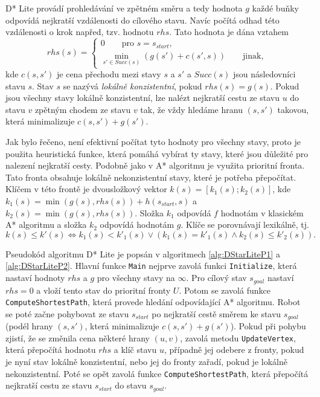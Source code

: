 D* Lite provádí prohledávání ve zpětném směru a tedy hodnota $g$ každé buňky odpovídá nejkratší vzdálenosti do cílového stavu. Navíc počítá odhad této vzdálenosti o krok napřed, tzv. hodnotu $rhs$. Tato hodnota je dána vztahem
\begin{equation}
	rhs(s)=\begin{cases}
	0 \qquad \text{pro } s=s_{start},\\
	\min_{s'\in Succ(s)}\left(g\left(s'\right)+c\left(s',s\right)\right) \qquad \text{jinak},
	\end{cases}
\end{equation}
kde $c(s,s')$ je cena přechodu mezi stavy $s$ a $s'$ a $Succ(s)$ jsou následovníci stavu $s$. Stav $s$ se nazývá \emph{lokálně konzistentní}, pokud $rhs(s)=g(s)$. Pokud jsou všechny stavy lokálně konzistentní, lze nalézt nejkratší cestu ze stavu $u$ do stavu $v$ zpětným chodem ze stavu $v$ tak, že vždy hledáme hranu $(s,s')$ takovou, která minimalizuje $c(s,s')+g(s')$.

Jak bylo řečeno, není efektivní počítat tyto hodnoty pro všechny stavy, proto je použita heuristická funkce, která pomáhá vybírat ty stavy, které jsou důležité pro nalezení nejkratší cesty. Podobně jako v A* algoritmu je využita prioritní fronta. Tato fronta obsahuje lokálně nekonzistentní stavy, které je potřeba přepočítat. Klíčem v této frontě je dvousložkový vektor $k(s)=[k_1(s);k_2(s)]$, kde $k_1(s)=\min(g(s),rhs(s))+h(s_{start},s)$ a $k_2(s)=\min(g(s),rhs(s))$. Složka $k_1$ odpovídá $f$ hodnotám v klasickém A* algoritmu a složka $k_2$ odpovídá hodnotám $g$. Klíče se porovnávají lexikálně, tj. $$k(s)\leq k'(s)\Leftrightarrow k_1(s)<k'_1(s)\vee (k_1(s)=k'_1(s)\wedge k_2(s)\leq k'_2(s)).$$

Pseudokód algoritmu D* Lite je popsán v algoritmech \ref{alg:DStarLiteP1} a \ref{alg:DStarLiteP2}. Hlavní funkce \texttt{Main} nejprve zavolá funkci \texttt{Initialize}, která nastaví hodnoty $rhs$ a $g$ pro všechny stavy na $\infty$. Pro cílový stav $s_{goal}$ nastaví $rhs=0$ a vloží tento stav do prioritní fronty $U$. Potom se zavolá funkce \texttt{ComputeShortestPath}, která provede hledání odpovídající A* algoritmu. Robot se poté začne pohybovat ze stavu $s_{start}$ po nejkratší cestě směrem ke stavu $s_{goal}$ (podél hrany $(s,s')$, která minimalizuje $c(s,s')+g(s')$). Pokud při pohybu zjistí, že se změnila cena některé hrany $(u,v)$, zavolá metodu \texttt{UpdateVertex}, která přepočítá hodnotu $rhs$ a klíč stavu $u$, případně jej odebere z fronty, pokud je nyní stav lokálně konzistentní, nebo jej do fronty zařadí, pokud je lokálně nekonzistentní. Poté se opět zavolá funkce \texttt{ComputeShortestPath}, která přepočítá nejkratší cestu ze stavu $s_{start}$ do stavu $s_{goal}$.

